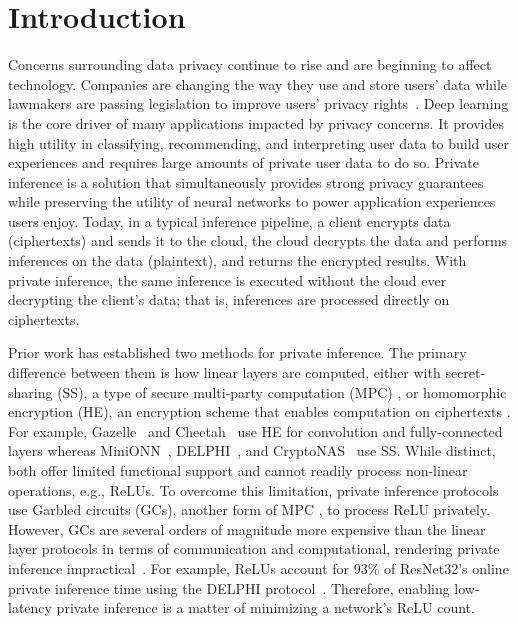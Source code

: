 
\section{Introduction}

Concerns surrounding data privacy continue to rise 
and are beginning to affect technology.
Companies are changing the way they use and store users' data
while lawmakers are passing legislation to improve users' privacy rights~\cite{hipaa, gdpr}.
Deep learning is the core driver of many applications impacted by privacy concerns.
It provides high utility in classifying, recommending, and interpreting user
data to build user experiences and requires large 
amounts of private user data to do so.
Private inference is a solution that simultaneously 
provides strong privacy guarantees while preserving the utility of neural networks 
to power application experiences users enjoy.
Today, in a typical inference pipeline, 
a client encrypts data (ciphertexts) and sends it to the cloud,
the cloud decrypts the data and performs inferences on the data (plaintext),
and returns the encrypted results.
With private inference, the same inference is executed
without the cloud ever decrypting the client's data;
that is, inferences are processed directly on ciphertexts.


Prior work has established two methods for private inference.
The primary difference between them is how linear layers are computed,
either with secret-sharing (SS), a type of secure multi-party computation (MPC) \cite{goldreich2019play,shamir1979share}, or homomorphic encryption (HE), an encryption scheme that enables computation on ciphertexts \cite{gentry2009fully,brakerski2014efficient}.
For example, Gazelle~\cite{juvekar2018gazelle} and Cheetah~\cite{br2020cheetah} use HE for convolution and fully-connected layers
whereas MiniONN~\cite{liu2017oblivious}, DELPHI~\cite{mishra2020delphi}, and CryptoNAS~\cite{ghodsi2020cryptonas}
use SS. 
While distinct, both offer limited functional support and cannot readily process non-linear operations, e.g., ReLUs. 
To overcome this limitation, private inference protocols use Garbled circuits (GCs), another form of MPC \cite{yao1982protocols,yao1986generate}, to process ReLU privately.
However, GCs are several orders of magnitude more expensive than the linear layer protocols in terms of communication and computational, rendering private inference impractical~\cite{ghodsi2020cryptonas}.
For example, ReLUs account for 93\% of ResNet32's online private inference time using the DELPHI protocol~\cite{mishra2020delphi}.
Therefore, enabling low-latency private inference is a matter of minimizing a network's ReLU count. 

